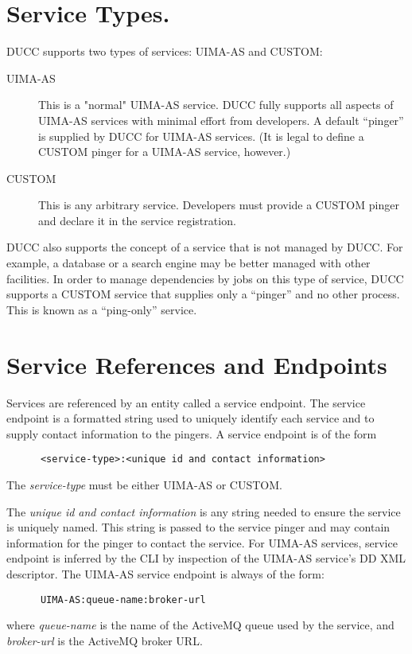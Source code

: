     \section{Service Types.}
    \label{sec:services.types}
      DUCC supports two types of services: UIMA-AS and CUSTOM:
      
      \begin{description}
          \item[UIMA-AS] This is a "normal" UIMA-AS service. DUCC fully supports all aspects of UIMA-AS
            services with minimal effort from developers.  A default ``pinger'' is supplied by DUCC
            for UIMA-AS services.  (It is legal to define a CUSTOM pinger for a UIMA-AS service,
            however.)
            
          \item[CUSTOM] This is any arbitrary service.  Developers must provide a CUSTOM pinger
            and declare it in the service registration.            
      \end{description}

      DUCC also supports the concept of a service that is not managed by DUCC.  For example, a
      database or a search engine may be better managed with other facilities.  In order to manage
      dependencies by jobs on this type of service, DUCC supports a CUSTOM service that supplies
      only a ``pinger'' and no other process.  This is known as a ``ping-only'' service.

      \section{Service References and Endpoints} 
      \label{sec:service.endpoints}
      Services are referenced by an entity called a service
      endpoint. The service endpoint is a formatted string used to uniquely identify each
      service and to supply contact information to the pingers.  A service endpoint
      is of the form 
\begin{verbatim}
      <service-type>:<unique id and contact information>
\end{verbatim}
      
      The {\em service-type} must be either UIMA-AS or CUSTOM.
      
      The {\em unique id and contact information} is any string needed to ensure the service is
      uniquely named.  This string is passed to the service pinger and may contain 
      information for the pinger to contact the service.  For UIMA-AS services, service endpoint is
      inferred by the CLI by inspection of the UIMA-AS service's DD XML descriptor.  The UIMA-AS
      service endpoint is always of the form:
\begin{verbatim}
      UIMA-AS:queue-name:broker-url
\end{verbatim}
      where {\em queue-name} is the name of the ActiveMQ queue used by the service, and {\em broker-url}
      is the ActiveMQ broker URL.


